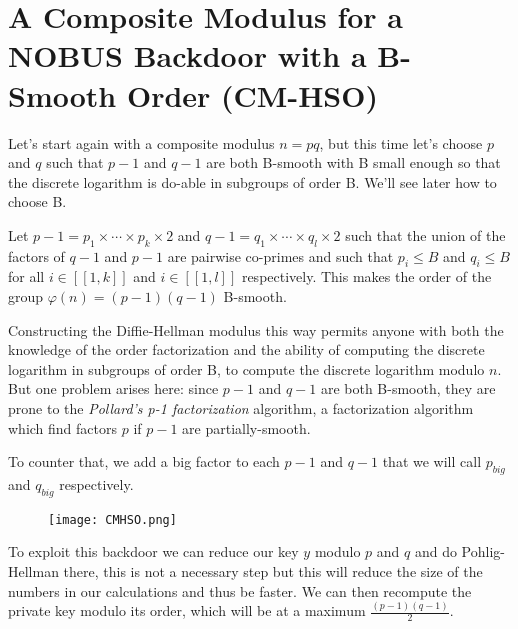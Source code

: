 \documentclass[a4paper,11pt,twocolumn]{article}
\begin{document}

\section{A Composite Modulus for a NOBUS Backdoor with a B-Smooth Order (CM-HSO)}

Let's start again with a composite modulus $n= pq$, but this time let's choose $p$ and $q$ such that $p-1$ and $q-1$ are both B-smooth with B small enough so that the discrete logarithm is do-able in subgroups of order B. We'll see later how to choose B.

Let $p-1 = p_1 \times \cdots \times p_k \times 2$ and $q-1 = q_1 \times \cdots \times q_l \times 2$ such that the union of the factors of $q-1$ and $p-1$ are pairwise co-primes and such that $p_i \leq B$ and $q_i \leq B$ for all $i \in [[1,k]]$ and $i \in [[1,l]]$ respectively. This makes the order of the group $\varphi(n) = (p-1)(q-1)$ B-smooth.

Constructing the Diffie-Hellman modulus this way permits anyone with both the knowledge of the order factorization and the ability of computing the discrete logarithm in subgroups of order B, to compute the discrete logarithm modulo $n$. But one problem arises here: since $p-1$ and $q-1$ are both B-smooth, they are prone to the \emph{Pollard's p-1 factorization} algorithm, a factorization algorithm which find factors $p$ if $p-1$ are partially-smooth.

To counter that, we add a big factor to each $p-1$ and $q-1$ that we will call $p_{big}$ and $q_{big}$ respectively. 

\begin{figure}[H]
\centering
\texttt{[image: CMHSO.png]}
\end{figure}

To exploit this backdoor we can reduce our key $y$ modulo $p$ and $q$ and do Pohlig-Hellman there, this is not a necessary step but this will reduce the size of the numbers in our calculations and thus be faster. We can then recompute the private key modulo its order, which will be at a maximum $\frac{(p-1)(q-1)}{2}$.

\end{document}

